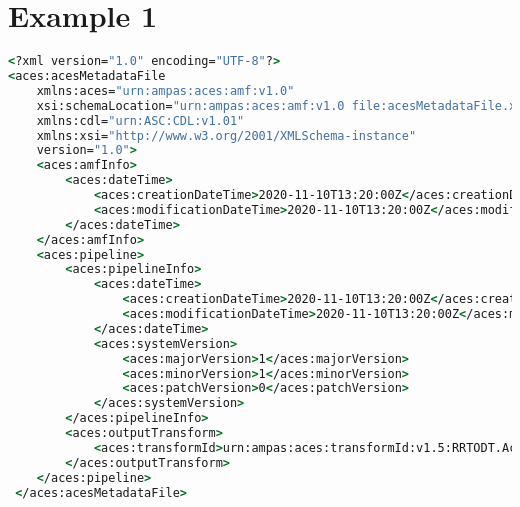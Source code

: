 \label{appendixB}

\section*{Example 1}

\begin{lstlisting}[language=csh]
<?xml version="1.0" encoding="UTF-8"?>
<aces:acesMetadataFile 
    xmlns:aces="urn:ampas:aces:amf:v1.0"
    xsi:schemaLocation="urn:ampas:aces:amf:v1.0 file:acesMetadataFile.xsd"
    xmlns:cdl="urn:ASC:CDL:v1.01"
    xmlns:xsi="http://www.w3.org/2001/XMLSchema-instance"
    version="1.0">
    <aces:amfInfo>
        <aces:dateTime>
            <aces:creationDateTime>2020-11-10T13:20:00Z</aces:creationDateTime>
            <aces:modificationDateTime>2020-11-10T13:20:00Z</aces:modificationDateTime>
        </aces:dateTime>
    </aces:amfInfo>
    <aces:pipeline>
        <aces:pipelineInfo>
            <aces:dateTime>
                <aces:creationDateTime>2020-11-10T13:20:00Z</aces:creationDateTime>
                <aces:modificationDateTime>2020-11-10T13:20:00Z</aces:modificationDateTime>
            </aces:dateTime>
            <aces:systemVersion>
                <aces:majorVersion>1</aces:majorVersion>
                <aces:minorVersion>1</aces:minorVersion>
                <aces:patchVersion>0</aces:patchVersion>
            </aces:systemVersion>
        </aces:pipelineInfo>
        <aces:outputTransform>
            <aces:transformId>urn:ampas:aces:transformId:v1.5:RRTODT.Academy.Rec2020_1000nits_15nits_ST2084.a1.1.0</aces:transformId>
        </aces:outputTransform>
    </aces:pipeline>
 </aces:acesMetadataFile>
\end{lstlisting}

\newpage
